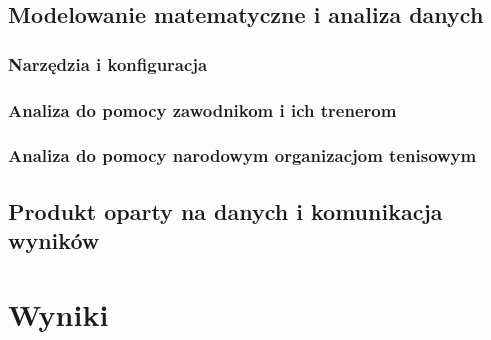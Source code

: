 \documentclass[12pt, a4paper]{article}
\begin{document}
\subsection{Modelowanie matematyczne i analiza danych}

\subsubsection{Narzędzia i konfiguracja}


\subsubsection{Analiza do pomocy zawodnikom i ich trenerom}


\subsubsection{Analiza do pomocy narodowym organizacjom tenisowym}

\subsection{Produkt oparty na danych i komunikacja wyników}

\section{Wyniki}
\end{document}
